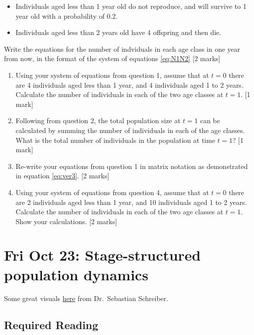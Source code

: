 \documentclass[]{book}
\begin{document}
\begin{itemize}
\item
  Individuals aged less than 1 year old do not reproduce, and will
  survive to 1 year old with a probability of 0.2.
\item
  Individuals aged less than 2 years old have 4 offspring and then die.
\end{itemize}

Write the equations for the number of indviduals in each age class in
one year from now, in the format of the system of equations
\eqref{eq:N1N2} {[}2 marks{]}

\begin{enumerate}
\def\labelenumi{\arabic{enumi}.}
\setcounter{enumi}{1}
\item
  Using your system of equations from question 1, assume that at \(t=0\)
  there are 4 individuals aged less than 1 year, and 4 individuals aged
  1 to 2 years. Calculate the number of individuals in each of the two
  age classes at \(t=1\). {[}1 mark{]}
\item
  Following from question 2, the total population size at \(t=1\) can be
  calculated by summing the number of individuals in each of the age
  classes. What is the total number of individuals in the population at
  time \(t=1\)? {[}1 mark{]}
\item
  Re-write your equations from question 1 in matrix notation as
  demonstrated in equation \eqref{eq:ver3}. {[}2 marks{]}
\item
  Using your system of equations from question 4, assume that at \(t=0\)
  there are 2 individuals aged less than 1 year, and 10 individuals aged
  1 to 2 years. Calculate the number of individuals in each of the two
  age classes at \(t=1\). Show your calculations. {[}2 marks{]}
\end{enumerate}

\chapter{Fri Oct 23: Stage-structured population
dynamics}\label{fri-oct-23-stage-structured-population-dynamics}

Some great visuals
\href{https://twitter.com/seb_schreiber/status/1318574271854116866}{here}
from Dr.~Sebastian Schreiber.

\section{Required Reading}\label{required-reading}
\end{document}
